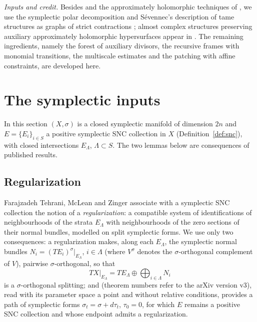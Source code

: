 \documentclass[11pt]{article}
\theoremstyle{remark}
\begin{document}
\emph{Inputs and credit.}
Besides \cite[Theorem 2.13]{FMZ} and the approximately holomorphic
techniques of \cite{Donaldson1996,Auroux1997,Auroux2001,Mohsen2019},
we use the symplectic polar decomposition \cite[Theorem 2.16]{Wendl}
and S\'evennec's description of tame structures as graphs of strict
contractions \cite[Theorem 2.37]{Wendl}; almost complex structures
preserving auxiliary approximately holomorphic hypersurfaces appear in
\cite[Section 8]{CM}. The remaining ingredients, namely the forest of
auxiliary divisors, the recursive frames with monomial transitions, the
multiscale estimates and the patching with affine constraints, are
developed here.

\section{The symplectic inputs}\label{sec:inputs}

In this section $(X,\sigma)$ is a closed symplectic manifold of
dimension $2n$ and $E=\{E_i\}_{i\in S}$ a positive symplectic SNC
collection in $X$ (Definition~\ref{def:snc}), with closed intersections
$E_\Lambda$, $\Lambda\subset S$. The two lemmas below are consequences
of published results.

\subsection{Regularization}

Farajzadeh Tehrani, McLean and Zinger \cite{FMZ} associate with a
symplectic SNC collection the notion of a \emph{regularization}: a
compatible system of identifications of neighbourhoods of the strata
$E_\Lambda$ with neighbourhoods of the zero sections of their normal
bundles, modelled on split symplectic forms. We use only two
consequences: a regularization makes, along each $E_\Lambda$, the
symplectic normal bundles $N_i=(TE_i)^{\sigma}|_{E_\Lambda}$,
$i\in\Lambda$ (where $V^\sigma$ denotes the $\sigma$-orthogonal
complement of $V$), pairwise $\sigma$-orthogonal, so that
\begin{equation}\label{eq:split}
 TX|_{E_\Lambda}=TE_\Lambda\oplus\bigoplus_{i\in\Lambda}N_i
\end{equation}
is a $\sigma$-orthogonal splitting; and \cite[Theorem 2.13]{FMZ}
(theorem numbers refer to the arXiv version v3), read with its
parameter space a point and without relative conditions, provides a
path of symplectic forms $\sigma_t=\sigma+d\tau_t$, $\tau_0=0$, for which
$E$ remains a positive SNC collection and whose endpoint admits a
regularization.
\end{document}

